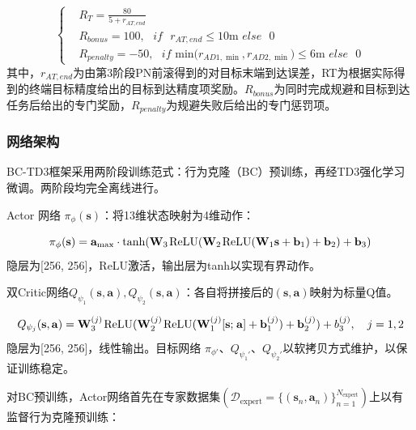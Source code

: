 \begin{equation}
\label{eq:75}
\left\{
\begin{aligned}
& {R_T} = \frac{{80}}{{5 + {r_{AT,end}}}} \\
& {R_{bonus}} = 100,{\text{ }}if{\text{ }}{r_{AT,end}} \leqslant 10{\text{m }}else{\text{ }}0 \\
& {R_{penalty}} =  - 50,{\text{ }}if{\text{ min(}}{r_{AD1,\min }},{r_{AD2,\min }}{\text{)}} \leqslant 6{\text{m }}else{\text{ }}0
\end{aligned}
\right.
\end{equation}
其中，${r_{AT,end}}$为由第3阶段PN前滚得到的对目标末端到达误差，RT为根据实际得到的终端目标精度给出的目标到达精度项奖励。${R_{bonus}}$为同时完成规避和目标到达任务后给出的专门奖励，${R_{penalty}}$为规避失败后给出的专门惩罚项。

\subsubsection{网络架构}
BC-TD3框架采用两阶段训练范式：行为克隆（BC）预训练，再经TD3强化学习微调。两阶段均完全离线进行。

Actor 网络 ${\pi _\phi }({\mathbf{s}})$：将13维状态映射为4维动作：

\begin{equation}
\label{eq:76}
{\pi _\phi }({\mathbf{s}}) = {{\mathbf{a}}_{\max }} \cdot \tanh ({{\mathbf{W}}_3}{\kern 1pt} {\text{ReLU}}({{\mathbf{W}}_2}{\kern 1pt} {\text{ReLU}}({{\mathbf{W}}_1}{\mathbf{s}} + {{\mathbf{b}}_1}) + {{\mathbf{b}}_2}) + {{\mathbf{b}}_3})
\end{equation}
隐层为[256, 256]，ReLU激活，输出层为tanh以实现有界动作。

双Critic网络${Q_{{\psi _1}}}({\mathbf{s}},{\mathbf{a}}),{Q_{{\psi _2}}}({\mathbf{s}},{\mathbf{a}})$：各自将拼接后的$({\mathbf{s}},{\mathbf{a}})$映射为标量Q值。

\begin{equation}
\label{eq:77}
{Q_{{\psi _j}}}({\mathbf{s}},{\mathbf{a}}) = {\mathbf{W}}_3^{(j)}{\kern 1pt} {\text{ReLU}}({\mathbf{W}}_2^{(j)}{\kern 1pt} {\text{ReLU}}({\mathbf{W}}_1^{(j)}[{\mathbf{s}};{\kern 1pt} {\mathbf{a}}] + {\mathbf{b}}_1^{(j)}) + {\mathbf{b}}_2^{(j)}) + b_3^{(j)},\quad j = 1,2
\end{equation}
隐层为[256, 256]，线性输出。目标网络 \(\pi_{\phi'}\)、\(Q_{\psi_1'}\)、\(Q_{\psi_2'}\)以软拷贝方式维护，以保证训练稳定。

对BC预训练，Actor网络首先在专家数据集$({\mathcal{D}_{{\text{expert}}}} = \{ ({{\mathbf{s}}_n},{{\mathbf{a}}_n})\} _{n = 1}^{{N_{{\text{expert}}}}})$上以有监督行为克隆预训练：

